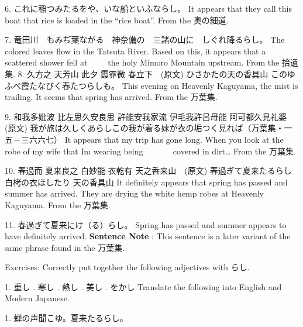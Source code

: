 \par{6. これに稲つみたるをや、いな船といふならし。 \hfill\break
It appears that they call this boat that rice is loaded in the “rice boat”. \hfill\break
From the 奥の細道. }

\par{7. 竜田川　もみぢ葉ながる　神奈備の　三諸の山に　しぐれ降るらし。 \hfill\break
The colored leaves flow in the Tatsuta River. Based on this, it appears that a scattered shower fell at      the holy Mimoro Mountain upstream. \hfill\break
From the 拾遺集. }
8. 久方之 天芳山 此夕 霞霏微 春立下　(原文) \hfill\break
ひさかたの天の香具山 このゆふべ霞たなびく春たつらしも。 \hfill\break
This evening on Heavenly Kaguyama, the mist is trailing. It seems that spring has arrived. \hfill\break
From the 万葉集. 
\par{9. 和我多妣波 比左思久安良思 許能安我家流 伊毛我許呂母能 阿可都久見礼婆　(原文) \hfill\break
我が旅は久しくあらしこの我が着る妹が衣の垢つく見れば（万葉集・一五－三六六七） \hfill\break
It appears that my trip has gone long. When you look at the robe of my wife that I\textquotesingle m wearing being         covered in dirt… \hfill\break
From the 万葉集. }

\par{10. 春過而 夏来良之 白妙能 衣乾有 天之香来山　(原文) \hfill\break
春過ぎて夏来たるらし  白栲の衣ほしたり  天の香具山 \hfill\break
It definitely appears that spring has passed and summer has arrived. \hfill\break
They are drying the white hemp robes at Heavenly Kaguyama. \hfill\break
From the 万葉集. }

\par{11. 春過ぎて夏来にけ（る）らし。 \hfill\break
Spring has passed and summer appears to have definitely arrived. \hfill\break
\hfill\break
\textbf{Sentence Note }: This sentence is a later variant of the same phrase found in the 万葉集. }

\par{Exercises: Correctly put together the following adjectives with らし. }

\par{1. 重し \hfill{}. 寒し \hfill{}. 熱し \hfill{}. 美し \hfill{}. をかし \hfill\break
\hfill\break
Translate the following into English and Modern Japanese. }

\par{1. 蝉の声聞こゆ。夏来たるらし。 }
     